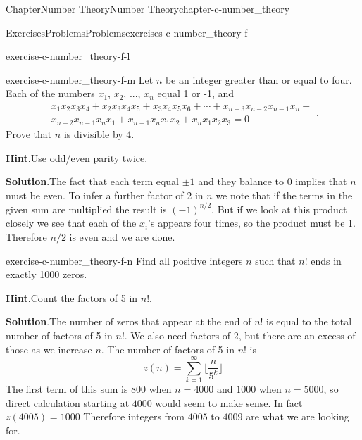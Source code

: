 \documentclass[oneside,10pt,]{book}
\newcommand{\blocktitlefont}{\relax}
\numberwithin{equation}{section}
\begin{document}
\begin{chapterptx}{Chapter}{Number Theory}{}{Number Theory}{}{}{chapter-c-number_theory}
\begin{exercises-section}{Exercises}{Problems}{}{Problems}{}{}{exercises-c-number_theory-f}
\begin{divisionexercise}{10}{}{}{exercise-c-number_theory-f-l}
\end{divisionexercise}%
\begin{divisionexercise}{11}{}{}{exercise-c-number_theory-f-m}%
Let \(n\) be an integer greater than or equal to four.  Each of the numbers \(x_1\), \(x_2\), ..., \(x_n\) equal 1 or -1, and%
\begin{equation*}
\begin{split}
x_1x_2x_3x_4+x_2x_3x_4x_5+x_3x_4x_5x_6+\cdots+x_{n-3}x_{n-2}x_{n-1}x_n+\\
x_{n-2}x_{n-1}x_nx_1+x_{n-1}x_nx_1x_2+x_nx_1x_2x_3=0
\end{split}\text{.}
\end{equation*}
Prove that \(n\) is divisible by 4.%
\par\smallskip%
\noindent\textbf{\blocktitlefont Hint}.\hypertarget{hint-c-number_theory-f-m-b}{}\quad{}Use odd\slash{}even parity twice.%
\par\smallskip%
\noindent\textbf{\blocktitlefont Solution}.\hypertarget{solution-c-number_theory-f-m-c}{}\quad{}The fact that each term equal \(\pm 1\) and they balance to 0 implies that \(n\) must be even.  To infer a further factor of 2 in \(n\) we note that if the terms in the given sum are multiplied the result is \((-1)^{n/2}\).   But if we look at this product closely we see that each of the \(x_i\)'s appears four times, so the product must be 1.  Therefore \(n/2\) is even and we are done.%
\end{divisionexercise}%
\begin{divisionexercise}{12}{}{}{exercise-c-number_theory-f-n}%
Find all positive integers \(n\) such that \(n!\) ends in exactly 1000 zeros.%
\par\smallskip%
\noindent\textbf{\blocktitlefont Hint}.\hypertarget{hint-c-number_theory-f-n-b}{}\quad{}Count the factors of 5 in \(n!\).%
\par\smallskip%
\noindent\textbf{\blocktitlefont Solution}.\hypertarget{solution-c-number_theory-f-n-c}{}\quad{}The number of zeros that appear at the end of \(n!\) is equal to the total number of factors of 5 in \(n!\).  We also need factors of 2, but there are an excess of those as we increase \(n\).  The number of factors of 5 in \(n!\) is%
\begin{equation*}
z(n)=\sum_{k=1}^{\infty} \lfloor \frac{n}{5^k} \rfloor
\end{equation*}
The first term of this sum is \(800\) when \(n=4000\) and \(1000\) when \(n=5000\), so direct calculation starting at \(4000\) would seem to make sense. In fact \(z(4005)=1000\) Therefore integers from \(4005\) to \(4009\) are what we are looking for. %

\end{divisionexercise}
\end{exercises-section}
\end{chapterptx}
\end{document}
